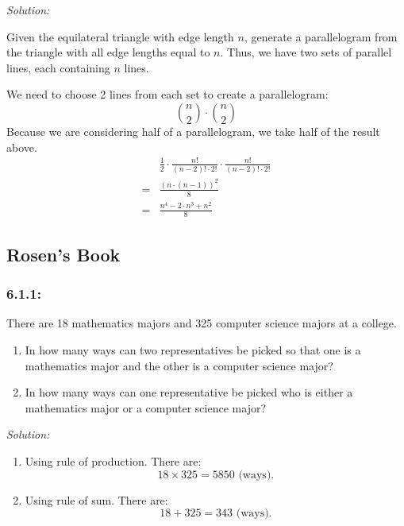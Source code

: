 \documentclass[a4paper]{article}
\begin{document}
\textit{Solution:}

Given the equilateral triangle with edge length $n$, generate a parallelogram from the triangle with all edge lengths equal to $n$. Thus, we have two sets of parallel lines, each containing $n$ lines.

We need to choose 2 lines from each set to create a parallelogram:
\begin{equation*}
	{n \choose 2} \cdot {n \choose 2}
\end{equation*}
Because we are considering half of a parallelogram, we take half of the result above.
\begin{align*}
	  & \frac{1}{2} \cdot \frac{n!}{(n - 2)! \cdot 2!} \cdot \frac{n!}{(n - 2)! \cdot 2!} \\
	= & \frac{(n \cdot (n - 1))^2}{8}                                                     \\
	= & \frac{n^4 - 2 \cdot n^3 + n^2}{8}
\end{align*}

\subsection*{Rosen's Book}
\subsubsection*{6.1.1:}There are 18 mathematics majors and 325 computer science majors at a college.
\begin{enumerate}[label = \textbf{\alph*)}]
	\item  In how many ways can two representatives be picked so that one is a mathematics major and the other is a computer science major?
	\item In how many ways can one representative be picked who is either a mathematics major or a computer science major?
	      
\end{enumerate}
\textit{Solution:}\\
\begin{enumerate}[label = \textbf{\alph*)}]
	\item Using rule of production. There are:
	      \begin{equation*}
		      18 \times 325 = 5850 \text{ (ways).}
	      \end{equation*}
	\item Using rule of sum. There are:
	      \begin{equation*}
		      18 + 325 = 343 \text{ (ways).}
	      \end{equation*}
\end{enumerate}
\end{document}
